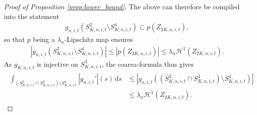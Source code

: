 \documentclass[11pt]{article}
\newcounter{statement}
\numberwithin{statement}{section}
\numberwithin{equation}{section}
\theoremstyle{remark}
\newcommand{\intd}{\, \mathrm{d}} 				%
\begin{document}
\begin{proof}[Proof of Proposition \ref{prop:lower_bound}]
        The above can therefore be compiled into the statement
        \begin{align}
          g_{n,i,t}\left(S^2_{K,n,i,t}\setminus S^4_{K,n,i,t} \right)
          \subset p(Z_{2K,n,i,t}), 
        \end{align}
        so that $p$ being a $\lambda_n$-Lipschitz map ensures
        \begin{align}\label{eq:rewritten}
          \left| g_{n,i,t} \left(S^2_{K,n,i,t}\setminus S^4_{K,n,i,t}
          \right) \right|   \leq |p(Z_{2K,n,i,t})|  \leq \lambda_n
          \mathcal{H}^1(Z_{2K,n,i,t}). 
        \end{align}
        As $g_{K,n,i,t}$ is injective on $S^3_{K,n,i,t}$, the
        coarea-formula thus gives
        \begin{align}
          \label{eq:S234H1}
          \begin{split}
            \int_{\left(S^2_{K,n,i,t} \cap S^3_{K,n,i,t} \right)
              \setminus S^4_{K,n,i,t} } \left |g_{n,i,t}' \right|(s)
            \intd s & \leq \left| g_{n,i,t} \left(\left(S^2_{K,n,i,t}
                  \cap S^3_{K,n,i,t} \right) \setminus S^4_{K,n,i,t}
              \right) \right| \\
            & \leq \lambda_n \mathcal{H}^1(Z_{2K,n,i,t}).
	  \end{split}
        \end{align}
        

\end{proof}
\end{document}
